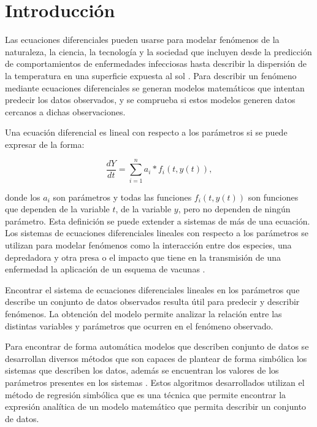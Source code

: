 \chapter*{Introducción}\label{chapter:introduction}

\qquad

Las ecuaciones diferenciales pueden usarse para modelar fenómenos de la naturaleza, la ciencia, la tecnología y la sociedad que incluyen desde la predicción de comportamientos de enfermedades infecciosas \cite{weiss2013sir} hasta describir la dispersión de la temperatura en una superficie expuesta al sol \cite{p-transferencia-calor}. Para describir un fenómeno mediante ecuaciones diferenciales se generan modelos matemáticos que intentan predecir los datos observados, y se comprueba si estos modelos generen datos cercanos a dichas observaciones.

Una ecuación diferencial es lineal con respecto a los parámetros si se puede expresar de la forma:

$$\frac{dY}{dt} = \sum_{i=1}^{n} a_i * f_i(t, y(t)),$$

donde los $a_i$ son parámetros y todas las funciones $f_i(t,y(t))$ son funciones que dependen de la variable $t$, de la variable $y$, pero no dependen de ningún parámetro. Esta definición se puede extender a sistemas de más de una ecuación. Los sistemas de ecuaciones diferenciales lineales con respecto a los parámetros se utilizan para modelar fenómenos como la interacción entre dos especies, una depredadora y otra presa \cite{Hoppensteadt:2006} o el impacto que tiene en la transmisión de una enfermedad la aplicación de un esquema de vacunas \cite{kuddus2021mathematical}.

Encontrar el sistema de ecuaciones diferenciales lineales en los parámetros que describe un conjunto de datos observados resulta útil para predecir y describir fenómenos. La obtención del modelo permite analizar la relación entre las distintas variables y parámetros que ocurren en el fenómeno observado.

Para encontrar de forma automática modelos que describen conjunto de datos se desarrollan diversos métodos que son capaces de plantear de forma simbólica los sistemas que describen los datos, además se encuentran los valores de los parámetros presentes en los sistemas \cite{gplearn, schmidt2013eureqa}. Estos algoritmos desarrollados utilizan el método de regresión simbólica que es una técnica que permite encontrar la expresión analítica de un modelo matemático que permita describir un conjunto de datos.

